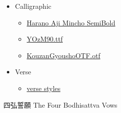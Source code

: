 \documentclass[letterpaper]{article}
\begin{document}
\vspace*{1cm}

\begin{itemize}
	\item[] {\LARGE Calligraphic}
	\begin{itemize}
		\item[] \href{https://gwmatthews.github.io/examples/the-four-vows-HaranoAjiMinchoSB.pdf}{Harano Aji Mincho SemiBold}
		\item[] \href{https://gwmatthews.github.io/examples/the-four-vows-YOzM90.pdf}{YOzM90.ttf}
		\item[] \href{https://gwmatthews.github.io/examples/the-four-vows-KouzanGyousho.pdf}{KouzanGyoushoOTF.otf}
	\end{itemize}
\end{itemize}
\vspace*{1cm}

\begin{itemize}
\item[] {\LARGE Verse}
\begin{itemize}
	\item[] \href{https://gwmatthews.github.io/examples/verse-test.pdf}{verse styles}
	
\end{itemize}

\end{itemize}
	
	
	
	
	\vfill\eject\pagebreak
	
\centering 四弘誓願 The Four Bodhisattva Vows
\end{document}
